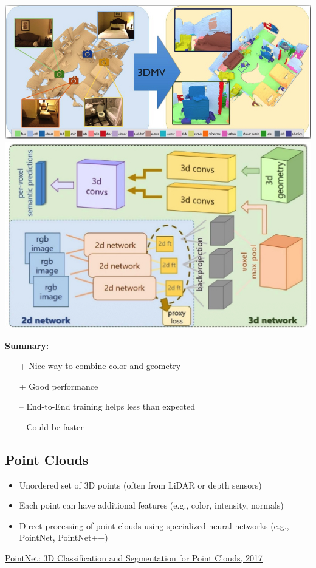 \begin{center}
    \includegraphics[width=0.65\columnwidth]{images/3D_and_multiview.jpeg}
    \includegraphics[width=0.65\columnwidth]{images/3D_and_multiview_2.jpeg}
    \label{fig:3D_and_multiview}
\end{center}

\textbf{Summary:}
\begin{itemize}[label={}] %
    \item[+] Nice way to combine color and geometry
    \item[+] Good performance 
    \item[--] End-to-End training helps less than expected
    \item[--] Could be faster  
\end{itemize}

\subsection{Point Clouds}
\begin{itemize}
    \item Unordered set of 3D points (often from LiDAR or depth sensors)
    \item Each point can have additional features (e.g., color, intensity, normals)
    \item Direct processing of point clouds using specialized neural networks (e.g., PointNet, PointNet++)
\end{itemize}

\href{https://arxiv.org/pdf/1604.03265}{PointNet: 3D Classification and Segmentation for Point Clouds, 2017}
    

